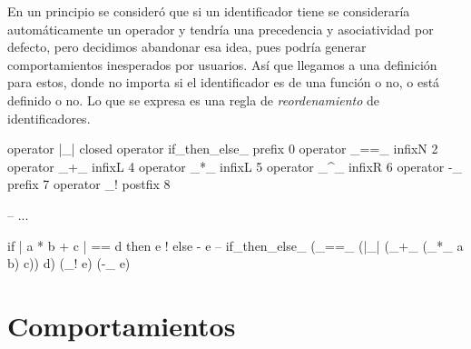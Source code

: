 \begin{blueleft}
En un principio se consideró que si un identificador tiene \inlinecode{\_} se consideraría automáticamente un operador y tendría una precedencia y asociatividad por defecto, pero decidimos abandonar esa idea, pues podría generar comportamientos inesperados por usuarios. Así que llegamos a una definición para estos, donde no importa si el identificador es de una función o no, o está definido o no. Lo que se expresa es una regla de \emph{reordenamiento} de identificadores.

\begin{anglercode}
operator |_|                closed
operator if_then_else_      prefix  0
operator _==_               infixN  2
operator _+_                infixL  4
operator _*_                infixL  5
operator _^_                infixR  6
operator -_                 prefix  7
operator _!                 postfix 8

-- ...

if | a * b + c | == d then e ! else - e
-- if_then_else_ (_==_ (|_| (_+_ (_*_ a b) c)) d) (_! e) (-_ e)
\end{anglercode}
\end{blueleft}

\section{Comportamientos}
